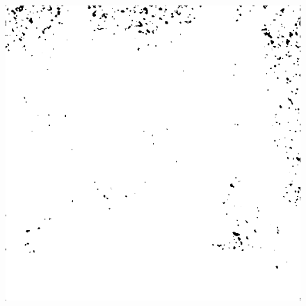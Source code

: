 \begin{figure}[H]
\begin{minipage}[t]{0.3\linewidth}
	\label{fig:hus_m25}
\end{minipage}
\begin{minipage}[t]{0.3\linewidth} %
	\includegraphics[width = 1\linewidth]{gfx/sit/sit_m25.png}
	\label{fig:sit_m25}
\end{minipage}
\end{figure}
